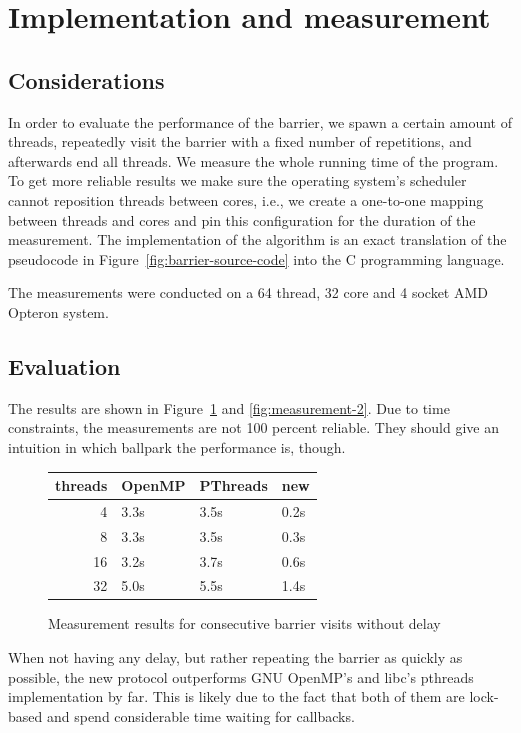 \documentclass[a4paper, 10pt]{article}
\begin{document}
\clearpage

\section{Implementation and measurement}
\subsection{Considerations}
In order to evaluate the performance of the barrier, we spawn a certain amount of threads, repeatedly visit the barrier with a fixed number of repetitions, and afterwards end all threads. We measure the whole running time of the program. To get more reliable results we make sure the operating system's scheduler cannot reposition threads between cores, i.e., we create a one-to-one mapping between threads and cores and pin this configuration for the duration of the measurement. The implementation of the algorithm is an exact translation of the pseudocode in Figure~\ref{fig:barrier-source-code} into the C programming language.

The measurements were conducted on a 64 thread, 32 core and 4 socket AMD Opteron system.
\subsection{Evaluation}
The results are shown in Figure~\ref{fig:measurement-1} and \ref{fig:measurement-2}. Due to time constraints, the measurements are not 100 percent reliable. They should give an intuition in which ballpark the performance is, though.
\begin{figure}[htbp]
	\centering
	\begin{tabular}{r | l l l }
		threads & OpenMP  & PThreads  & new \\
		\hline
		 4      & 3.3s    & 3.5s      & 0.2s \\
		 8      & 3.3s    & 3.5s      & 0.3s \\
		16      & 3.2s    & 3.7s      & 0.6s \\
		32      & 5.0s    & 5.5s      & 1.4s \\
	\end{tabular}
	\caption{Measurement results for consecutive barrier visits without delay}
	\label{fig:measurement-1}
\end{figure}

When not having any delay, but rather repeating the barrier as quickly as possible, the new protocol outperforms GNU OpenMP's and libc's pthreads implementation by far. This is likely due to the fact that both of them are lock-based and spend considerable time waiting for callbacks.
\end{document}
